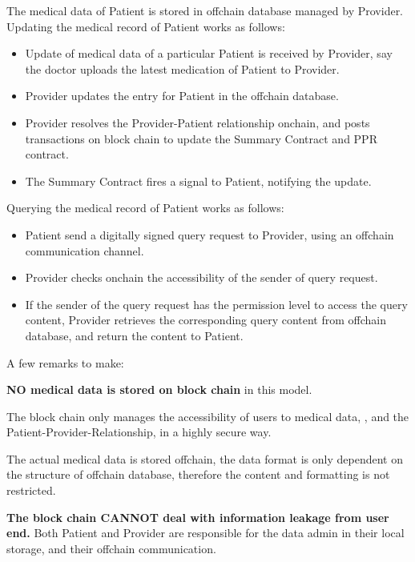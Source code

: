 \documentclass[]{scrartcl}
\begin{document}
The medical data of Patient is stored in offchain database managed by Provider.
Updating the medical record of Patient works as follows:
\begin{itemize}
\item Update of medical data of a particular Patient is received by Provider, say the doctor uploads the latest medication of Patient to Provider.

\item Provider updates the entry for  Patient in the offchain database.

\item Provider resolves the Provider-Patient relationship onchain, and posts transactions on block chain to update the Summary Contract and PPR contract.

\item The Summary Contract fires a signal to Patient, notifying the update.
\end{itemize}

Querying the medical record of Patient works as follows:

\begin{itemize}
\item Patient send a digitally signed query request to Provider, using an offchain communication channel.

\item Provider checks onchain the accessibility of the sender of query request.

\item If the sender of the query request has the permission level to access the query content, Provider retrieves the corresponding query content from offchain database, and return the content to Patient.
\end{itemize}	

A few remarks to make:
\begin{list}{}{}
	\item \textbf{NO medical data is stored on block chain} in this model.
	
	\item The block chain only manages the accessibility of users to medical data, , and the Patient-Provider-Relationship, in a highly secure way. 
	
	\item The actual medical data is stored offchain, the data format is only dependent on the structure of offchain database, therefore the content and formatting is not restricted.
	
	\item \textbf{The block chain CANNOT deal with information leakage from user end.} Both Patient and Provider are responsible for the data admin in their local storage, and their offchain communication. 
\end{list}
\end{document}
